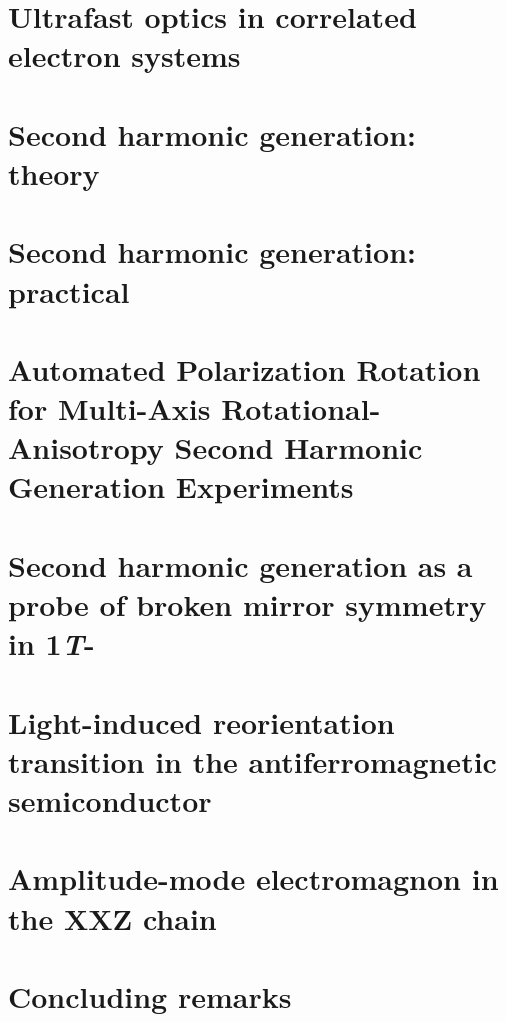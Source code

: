 \documentclass[
    letterpaper,
    12pt,
    openbib,
]{memoir}
\begin{document}
\frontmatter*


\acknowledgements

\clearpage
\preface

\clearpage

\tableofcontents
\clearpage
\listoffigures
\clearpage
\listoftables
\clearpage

\mainmatter*
\chapter{Ultrafast optics in correlated electron systems\label{ch:intro}}

\chapter{Second harmonic generation: theory\label{ch:shgtheory}}

\chapter{Second harmonic generation: practical}\label{ch:shgpractice}

\chapter{Automated Polarization Rotation for Multi-Axis Rotational-Anisotropy Second Harmonic Generation Experiments}\label{ch:polrotators}
\chapter{Second harmonic generation as a probe of broken mirror symmetry in 1\textit{T}-}\label{ch:tastwo}
\chapter{Light-induced reorientation transition in the antiferromagnetic semiconductor }\label{ch:cmb}
\chapter{Amplitude-mode electromagnon in the XXZ chain }\label{ch:cubr2}
\chapter{Concluding remarks}\label{ch:conclusion}

\backmatter*

\end{document}
